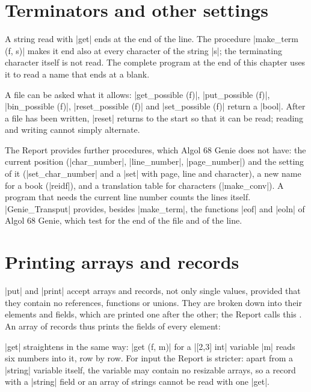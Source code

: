 \section{Terminators and other settings}\label{sec-make-term}

A string read with \code|get| ends at the end of the line. The
procedure \code|make_term (f, s)| makes it end also at every character of
the string \code|s|; the terminating character itself is not read. The
complete program at the end of this chapter uses it to read a name that
ends at a blank.

A file can be asked what it allows: \code|get_possible (f)|,
\code|put_possible (f)|, \code|bin_possible (f)|,
\code|reset_possible (f)| and \code|set_possible (f)| return a
\code|bool|. After a file has been written, \code|reset| returns to the
start so that it can be read; reading and writing cannot simply
alternate.

The Report provides further procedures, which Algol 68 Genie does not
have: the current position (\code|char_number|, \code|line_number|,
\code|page_number|) and the setting of it (\code|set_char_number| and a
\code|set| with page, line and character), a new name for a book
(\code|reidf|), and a translation table for characters
(\code|make_conv|). A program that needs the current line number counts
the lines itself. \code|Genie_Transput| provides, besides
\code|make_term|, the functions \code|eof| and \code|eoln| of Algol 68
Genie, which test for the end of the file and of the line.

\section{Printing arrays and records}\label{sec-straightening}

\code|put| and \code|print| accept arrays and records, not only single
values, provided that they contain no references, functions or unions. They are broken down into their elements
and fields,
which are printed one after the other; the Report calls this
. An array of records thus prints the fields of every
element:


\code|get| straightens in the same way: \code|get (f, m)| for a
\code|[2,3] int| variable \code|m| reads six numbers into it, row by row.
For input the Report is stricter: apart from a \code|string| variable
itself, the variable may contain no resizable arrays, so a record with a
\code|string| field or an array of strings cannot be read with one
\code|get|.

